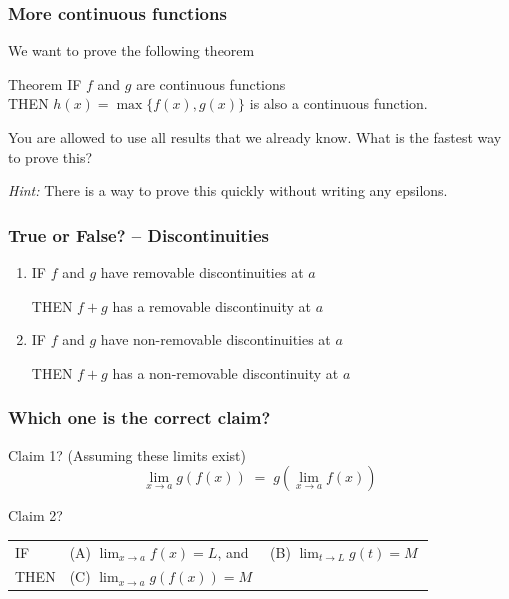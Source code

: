 \documentclass[14pt]{beamer}
\begin{document}
\begin{frame}
	\frametitle{More continuous functions}

	We want to prove the following theorem
	\begin{block}{Theorem}
		IF $f$ and $g$ are continuous functions \\ THEN $h(x) = \max \{ f(x), g(x) \}$
		is also a continuous function.
	\end{block}

	You are allowed to use all results that we already know. What is the fastest
	way to prove this?

	\vfill

	\emph{Hint:} There is a way to prove this quickly without writing any epsilons.

	\vfill
\end{frame}

\begin{frame}
	\frametitle{True or False? -- Discontinuities}

	\begin{enumerate}
		\item IF $f$ and $g$ have removable discontinuities at $a$

			THEN $f+g$ has a removable discontinuity at $a$

		\item IF $f$ and $g$ have non-removable discontinuities at $a$

			THEN $f+g$ has a non-removable discontinuity at $a$
	\end{enumerate}
\end{frame}

\begin{frame}
	\frametitle{Which one is the correct claim?}

	\begin{block}{Claim 1?}
		(Assuming these limits exist)
		\[
			\lim_{x \to a}g(f(x)) \; = \; g \left( \lim_{x \to a}f(x) \right)
		\]
	\end{block}

	\vfill

	\begin{block}{Claim 2?}
		\begin{tabular}{lll}
			IF   & {\color{blue} (A)} $\displaystyle \lim_{x \to a}f(x) = L$, \quad and & {\color{blue} (B)} $\displaystyle \lim_{t \to L}g(t) = M \ $ \\
			THEN & {\color{blue} (C)} $\displaystyle \lim_{x \to a}g(f(x)) = M \;$
		\end{tabular}
	\end{block}
\end{frame}
\end{document}
